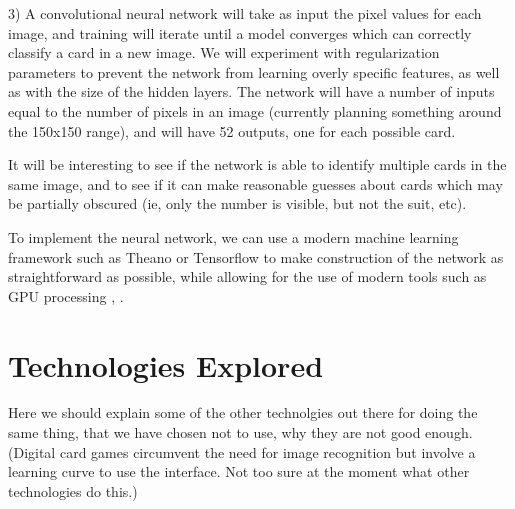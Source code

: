 \documentclass{article}
\begin{document}
3) A convolutional neural network \cite{conv} will take as input the pixel values for each image, and training will iterate until a model converges which can correctly classify a card in a new image. We will experiment with regularization parameters to prevent the network from learning overly specific features, as well as with the size of the hidden layers. The network will have a number of inputs equal to the number of pixels in an image (currently planning something around the 150x150 range), and will have 52 outputs, one for each possible card.

It will be interesting to see if the network is able to identify multiple cards in the same image, and to see if it can make reasonable guesses about cards which may be partially obscured (ie, only the number is visible, but not the suit, etc).

To implement the neural network, we can use a modern machine learning framework such as Theano or Tensorflow to make construction of the network as straightforward as possible, while allowing for the use of modern tools such as GPU processing \cite{gpu2}, \cite{gpu}.

\section{Technologies Explored}
Here we should explain some of the other technolgies out there for doing the same thing, that we have chosen not to use, why they are not good enough. (Digital card games circumvent the need for image recognition but involve a learning curve to use the interface. Not too sure at the moment what other technologies do this.)



\nocite{*}


\end{document}
